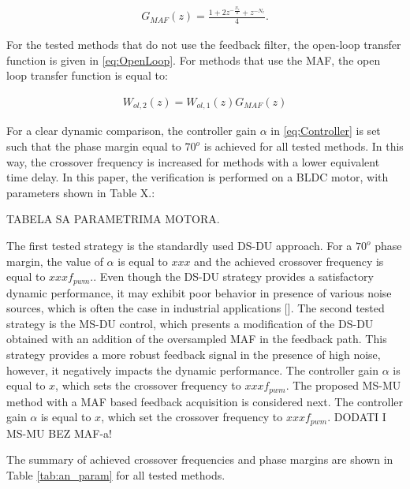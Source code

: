 \documentclass[journal]{IEEEtran}
\begin{document}
\begin{equation}
\begin{aligned}
G_{MAF}(z) = \frac{1 + 2z^{-\frac{N_c}{2}} + z^{-N_c}}{4}.
\label{eq:MAF} 
\end{aligned}    
\end{equation}

For the tested methods that do not use the feedback filter, the open-loop transfer function is given in \eqref{eq:OpenLoop}. For methods that use the MAF, the open loop transfer function is equal to:

\begin{equation}
\begin{aligned}
W_{ol,2}(z) = W_{ol,1}(z) G_{MAF}(z)
\label{eq:OpenLoop_MAF} 
\end{aligned}    
\end{equation}

For a clear dynamic comparison, the controller gain $\alpha$ in \eqref{eq:Controller} is set such that the phase margin equal to $70^o$ is achieved for all tested methods. In this way, the crossover frequency is increased for methods with a lower equivalent time delay. 
In this paper, the verification is performed on a BLDC motor, with parameters shown in Table X.:

TABELA SA PARAMETRIMA MOTORA.


The first tested strategy is the standardly used DS-DU approach. For a $70^o$ phase margin, the value of $\alpha$ is equal to $xxx$ and the achieved crossover frequency is equal to $xxx f_{pwm}$.. Even though the DS-DU strategy provides a satisfactory dynamic performance, it may exhibit poor behavior in presence of various noise sources, which is often the case in industrial applications [].
The second tested strategy is the MS-DU control, which presents a modification of the DS-DU obtained with an addition of the oversampled MAF in the feedback path. This strategy provides a more robust feedback signal in the presence of high noise, however, it negatively impacts  the dynamic performance. The controller gain $\alpha$ is equal to $x$, which sets the crossover frequency to $xxx  f_{pwm}$.
The proposed MS-MU method with a MAF based feedback acquisition is considered next. 
The controller gain $\alpha$ is equal to $x$, which set the crossover frequency to $xxx  f_{pwm}$.
DODATI I MS-MU BEZ MAF-a!

The summary of achieved crossover frequencies and phase margins are shown in Table \ref{tab:an_param} for all tested methods. 
\end{document}
